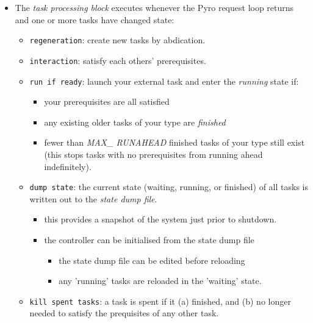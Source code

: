\documentclass[12pt]{amsart}
\begin{document}
\begin{itemize}
\item The {\em task processing block} executes whenever the Pyro request
loop returns and one or more tasks have changed state: 

    \begin{itemize} 
    \item \verb#regeneration#: create new tasks by abdication.

    \item \verb#interaction#: satisfy each others' prerequisites. 

    \item \verb#run if ready#: launch your external task and enter the
    {\em running} state if:
        \begin{itemize}
        \item your prerequisites are all satisfied
        \item any existing older tasks of your type are {\em finished} 
        \item fewer than {\em MAX\_ RUNAHEAD} finished tasks of your
        type still exist (this stops tasks with no prerequisites from
        running ahead indefinitely).
        \end{itemize}

    \item \verb#dump state#: the current state (waiting, running, or
    finished) of all tasks is written out to the {\em state dump file}.
        \begin{itemize}
        \item this provides a snapshot of the system just prior to shutdown.

        \item the controller can be initialised from the state dump file
            \begin{itemize}
            \item the state dump file can be edited before reloading

            \item any 'running' tasks are reloaded in the 'waiting' state.
            \end{itemize}
        \end{itemize}

    \item \verb#kill spent tasks#: a task is spent if it (a) finished,
    and (b) no longer needed to satisfy the prequisites of any other
    task.
       \begin{itemize}


\end{itemize}
\end{itemize}
\end{itemize}
\end{document}
